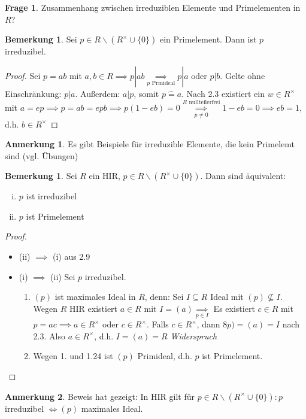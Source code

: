 \documentclass[a4paper, titlepage]{article}
\theoremstyle{definition}
\newtheorem{bem}[satz]{Bemerkung}
\newtheorem*{anm}{Anmerkung}
\newtheorem*{frage}{Frage}
\begin{document}
\begin{frage}
    Zusammenhang zwischen irreduziblen Elemente und Primelementen in $R$?
\end{frage}
\begin{bem} 
    Sei $p\in R\backslash(R^{\times}\cup \{0\})$ ein Primelement. Dann ist $p$ irreduzibel.
\end{bem}
\begin{proof}
    Sei $p=ab$ mit $a,b\in R\implies p|ab \underset{p \text{ Prmideal}}{\implies} p|a \text{ oder } p|b$. Gelte ohne Einschränkung: $p|a$. Außerdem: $a|p$, somit $p\widehat= a$. Nach 2.3 existiert ein $w\in R^{\times }$ mit $a=ep\implies p=ab=epb\implies p(1-eb)=0\underset{p\neq 0}{\overset{R \text{ nullteilerfrei}}{\implies}} 1-eb=0 \implies eb=1$, d.h. $b\in R^{\times}$
\end{proof}
\begin{anm}
    Es gibt Beispiele für irreduzible Elemente, die kein Primelemt sind (vgl. Übungen)
\end{anm}
\begin{bem}
    Sei $R$ ein HIR, $p\in R\backslash(R^{\times}\cup \{0\})$. Dann sind äquivalent:
    \begin{enumerate}[(i)]
        \item $p$ ist irreduzibel
        \item $p$ ist Primelement
    \end{enumerate}
\end{bem}
\begin{proof}
    \begin{itemize}
        \item (ii) $\implies$ (i) aus 2.9
        \item (i) $\implies$ (ii) Sei $p$ irreduzibel. 
        \begin{enumerate}
            \item $(p)$ ist maximales Ideal in $R$, denn: Sei $I\subseteq R $ Ideal mit $(p)\not\subseteq I$. Wegen $R$ HIR existiert $a\in R$ mit $I=(a) \underset{p\in I}{\implies}$ Es existiert $c\in R$ mit $p=ac\implies a\in R^{\times}$ oder $c\in R^{\times}$. Falls $c\in R^{\times}$, dann $8p)=(a)=I$ nach 2.3. Also $a\in R^{\times}$, d.h. $I=(a)=R$ \textit{Widerspruch}
        \item Wegen 1. und 1.24 ist $(p)$ Primideal, d.h. $p$ ist Primelement. 
        \end{enumerate}
    \end{itemize}
\end{proof}
\begin{anm}
    Beweis hat gezeigt: In HIR gilt für $p\in R\backslash(R^{\times}\cup \{0\}): p$ irreduzibel $\Leftrightarrow (p)$ maximales Ideal.
\end{anm}
\end{document}

